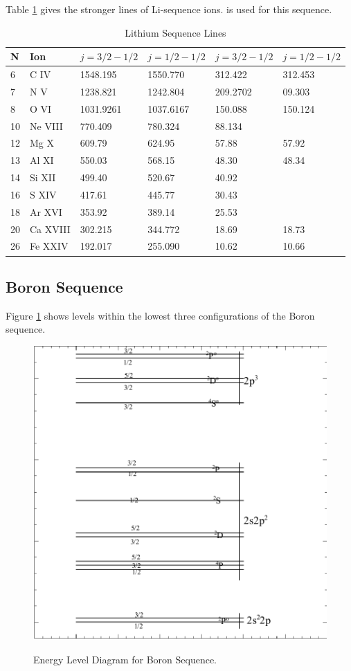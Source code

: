 Table \ref{tab:LiSequence} gives the stronger lines of Li-sequence ions.    is used for this sequence.

\begin{table}
\caption{Lithium Sequence Lines }
\label{tab:LiSequence}
\begin{tabular}{llllll}
\hline
N& Ion& $j=3/2-1/2$& $j=1/2-1/2$& $j=3/2-1/2$& $j=1/2-1/2$\\
\hline
6& C IV& 1548.195& 1550.770& 312.422& 312.453\\
7& N V&  1238.821& 1242.804& 209.2702& 09.303\\
8& O VI& 1031.9261& 1037.6167& 150.088& 150.124\\
10& Ne VIII& 770.409& 780.324& 88.134\\
12& Mg X& 609.79& 624.95& 57.88& 57.92\\
13& Al XI& 550.03& 568.15& 48.30& 48.34\\
14& Si XII& 499.40& 520.67& 40.92\\
16& S XIV& 417.61& 445.77& 30.43\\
18& Ar XVI& 353.92& 389.14& 25.53\\
20& Ca XVIII& 302.215& 344.772& 18.69& 18.73\\
26& Fe XXIV& 192.017& 255.090& 10.62& 10.66\\
\hline
\end{tabular}
\end{table}

\subsection{Boron Sequence}

Figure \ref{fig:AtomBoronSequence} shows levels within
the lowest three configurations of the Boron
sequence.

\begin{figure}
\centering
\includegraphics[scale=0.6]{AtomBoronSequence}
\label{fig:AtomBoronSequence}
\caption{Energy Level Diagram for Boron Sequence.}
\end{figure}

